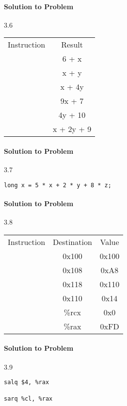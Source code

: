 \documentclass{report}
\begin{document}
\paragraph{Solution to Problem } 3.6 \\
\begin{center}
\begin{tabular}{ |c|c| } 
\hline
Instruction & Result \\
 & 6 + x \\
 & x + y \\
 & x + 4y \\
 & 9x + 7 \\
 & 4y + 10 \\
 & x + 2y + 9 \\
\hline
\end{tabular}
\end{center}

\paragraph{Solution to Problem } 3.7 \\
\begin{lstlisting}
long x = 5 * x + 2 * y + 8 * z;
\end{lstlisting}

\paragraph{Solution to Problem } 3.8 \\
\begin{center}
\begin{tabular}{ |c|c|c| } 
\hline
Instruction & Destination & Value \\
 & 0x100 & 0x100 \\
 & 0x108 & 0xA8 \\
 & 0x118 & 0x110 \\
 & 0x110 & 0x14 \\
 & \%rcx & 0x0 \\
 & \%rax & 0xFD \\
\hline
\end{tabular}
\end{center}

\paragraph{Solution to Problem } 3.9 \\
\begin{lstlisting}
salq $4, %rax 

sarq %cl, %rax 

\end{lstlisting}
\end{document}
